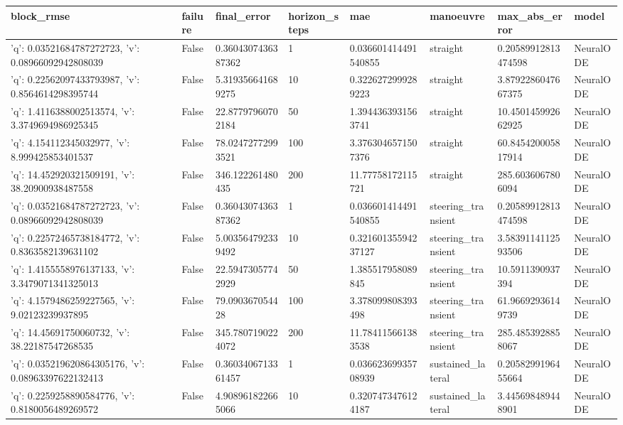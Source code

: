 \begin{tabular}{llllllll}
 \toprule
block\_rmse & failure & final\_error & horizon\_steps & mae & manoeuvre & max\_abs\_error & model \\ \midrule
{'q': 0.03521684787272723, 'v': 0.08966092942808039} & False & 0.3604307436387362 & 1 & 0.036601414491540855 & straight & 0.20589912813474598 & NeuralODE \\
{'q': 0.22562097433793987, 'v': 0.8564614298395744} & False & 5.319356641689275 & 10 & 0.3226272999289223 & straight & 3.8792286047667375 & NeuralODE \\
{'q': 1.4116388002513574, 'v': 3.3749694986925345} & False & 22.87797960702184 & 50 & 1.3944363931563741 & straight & 10.450145992662925 & NeuralODE \\
{'q': 4.154112345032977, 'v': 8.999425853401537} & False & 78.02472772993521 & 100 & 3.3763046571507376 & straight & 60.845420005817914 & NeuralODE \\
{'q': 14.452920321509191, 'v': 38.20900938487558} & False & 346.122261480435 & 200 & 11.77758172115721 & straight & 285.6036067806094 & NeuralODE \\
{'q': 0.03521684787272723, 'v': 0.08966092942808039} & False & 0.3604307436387362 & 1 & 0.036601414491540855 & steering\_transient & 0.20589912813474598 & NeuralODE \\
{'q': 0.22572465738184772, 'v': 0.8363582139631102} & False & 5.003564792339492 & 10 & 0.32160135594237127 & steering\_transient & 3.5839114112593506 & NeuralODE \\
{'q': 1.4155558976137133, 'v': 3.3479071341325013} & False & 22.59473057742929 & 50 & 1.385517958089845 & steering\_transient & 10.5911390937394 & NeuralODE \\
{'q': 4.1579486259227565, 'v': 9.02123239937895} & False & 79.090367054428 & 100 & 3.378099808393498 & steering\_transient & 61.96692936149739 & NeuralODE \\
{'q': 14.45691750060732, 'v': 38.22187547268535} & False & 345.7807190224072 & 200 & 11.784115661383538 & steering\_transient & 285.4853928858067 & NeuralODE \\
{'q': 0.035219620864305176, 'v': 0.08963397622132413} & False & 0.3603406713361457 & 1 & 0.03662369935708939 & sustained\_lateral & 0.2058299196455664 & NeuralODE \\
{'q': 0.2259258890584776, 'v': 0.8180056489269572} & False & 4.908961822665066 & 10 & 0.3207473476124187 & sustained\_lateral & 3.445698489448901 & NeuralODE \\

\end{tabular}
